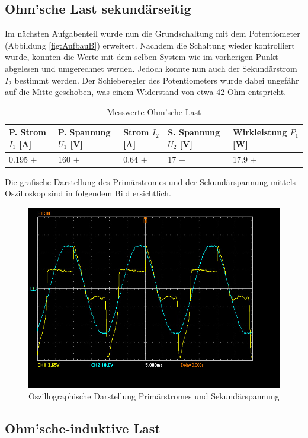 \documentclass[12pt,a4paper,twoside]{article}
\begin{document}
\subsection{Ohm'sche Last sekundärseitig}

Im nächsten Aufgabenteil wurde nun die Grundschaltung mit dem Potentiometer (Abbildung \ref{fig:AufbauB}) erweitert. Nachdem die Schaltung wieder kontrolliert wurde, konnten die Werte mit dem selben System wie im vorherigen Punkt abgelesen und umgerechnet werden.
Jedoch konnte nun auch der Sekundärstrom $I_{2}$ bestimmt werden. Der Schieberegler des Potentiometers wurde dabei ungefähr auf die Mitte geschoben, was einem Widerstand von etwa 42 Ohm entspricht.

\begin{table}[H]
    \centering
    \caption{Messwerte Ohm'sche Last}
    \label{tab:messwerteLeerlauf}
    \begin{tabular}{| l | l | l | l | l |}
        \hline
        P. Strom $I_{1}$ [A]  & P. Spannung $U_{1}$ [V] & Strom $I_{2}$ [A] & S. Spannung $U_{2}$ [V] & Wirkleistung $P_{1}$ [W] \\
        \hline
        0.195 $\pm$  & 160 $\pm$  & 0.64 $\pm$  & 17 $\pm$  & 17.9 $\pm$  \\
        \hline
    \end{tabular}
\end{table}

\noindent
Die grafische Darstellung des Primärstromes und der Sekundärspannung mittels Oszilloskop sind in folgendem Bild ersichtlich.

\begin{figure}[H]
    \centering
    \includegraphics[width=0.6\linewidth, angle=0]{nudes/A2 Oszi.jpg}
    \caption{Oszillographische Darstellung Primärstromes und Sekundärspannung}
    \label{fig:OszilloskopB}
\end{figure}


\subsection{Ohm'sche-induktive Last}
\end{document}
